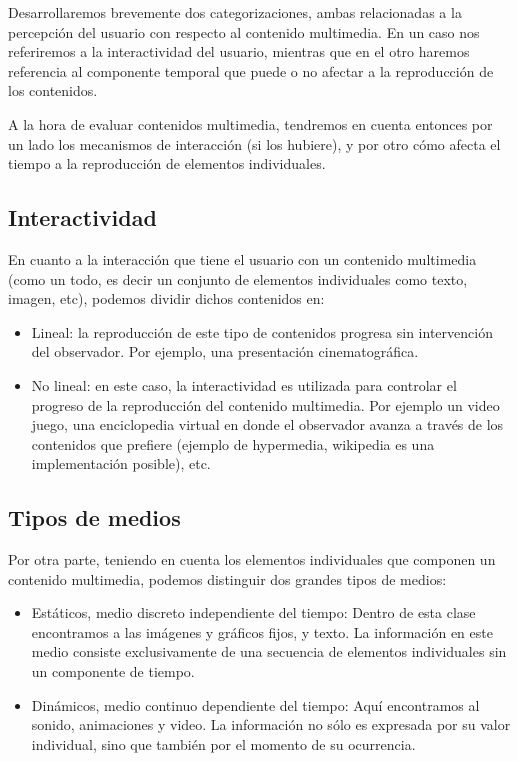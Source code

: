 \documentclass[12pt]{article}
\begin{document}
Desarrollaremos brevemente dos categorizaciones, ambas relacionadas a la 
percepción del usuario con respecto al contenido multimedia. En un caso 
nos referiremos a la interactividad del usuario, mientras que en el otro 
haremos referencia al componente temporal que puede o no afectar a la
reproducción de los contenidos. 

A la hora de evaluar contenidos multimedia, tendremos en cuenta entonces
por un lado los mecanismos de interacción (si los hubiere), y por otro 
cómo afecta el tiempo a la reproducción de elementos individuales. 

\subsection*{Interactividad}
En cuanto a la interacción que tiene el usuario con un contenido 
multimedia (como un todo, es decir un conjunto de elementos individuales
como texto, imagen, etc), podemos dividir dichos contenidos en: 
\begin{itemize}
\item Lineal: la reproducción de este tipo de contenidos progresa 
sin intervención del observador. Por ejemplo, una presentación cinematográfica.  
\item No lineal: en este caso, la interactividad es utilizada para 
controlar el progreso de la reproducción del contenido multimedia. Por 
ejemplo un video juego, una enciclopedia virtual en donde el observador
avanza a través de los contenidos que prefiere (ejemplo de hypermedia, 
wikipedia es una implementación posible), etc. 
\end{itemize}

\subsection*{Tipos de medios}
Por otra parte, teniendo en cuenta los elementos individuales que componen un 
contenido multimedia, podemos distinguir dos grandes tipos de medios: 

\begin{itemize}
\item{Estáticos, medio discreto independiente del tiempo}: 
Dentro de esta clase encontramos a las imágenes y gráficos fijos, y texto. La información 
en este medio consiste exclusivamente de una secuencia de elementos individuales 
sin un componente de tiempo.
\item{Dinámicos, medio continuo dependiente del tiempo}: 
Aquí encontramos al sonido, animaciones y video. La información no sólo es 
expresada por su valor individual, sino que también por el momento 
de su ocurrencia.
\end{itemize}
\end{document}
